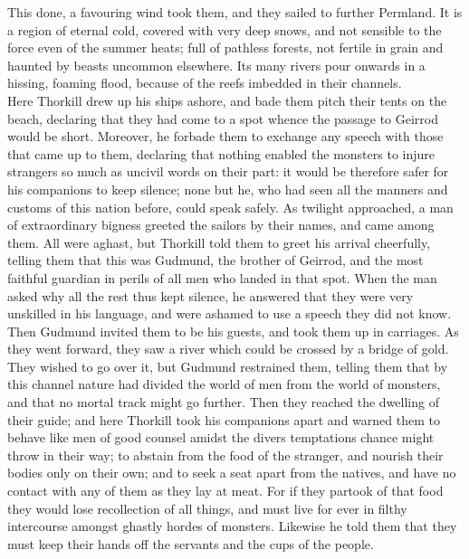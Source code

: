\documentclass[10pt,a4paper]{report}
\begin{document}
This done, a favouring wind took them, and they sailed to further Permland. It is a region of eternal cold, covered with very deep snows, and not sensible to the force even of the summer heats; full of pathless forests, not fertile in grain and haunted by beasts uncommon elsewhere. Its many rivers pour onwards in a hissing, foaming flood, because of the reefs imbedded in their channels.\\

Here Thorkill drew up his ships ashore, and bade them pitch their tents on the beach, declaring that they had come to a spot whence the passage to Geirrod would be short. Moreover, he forbade them to exchange any speech with those that came up to them, declaring that nothing enabled the monsters to injure strangers so much as uncivil words on their part: it would be therefore safer for his companions to keep silence; none but he, who had seen all the manners and customs of this nation before, could speak safely. As twilight approached, a man of extraordinary bigness greeted the sailors by their names, and came among them. All were aghast, but Thorkill told them to greet his arrival cheerfully, telling them that this was Gudmund, the brother of Geirrod, and the most faithful guardian in perils of all men who landed in that spot. When the man asked why all the rest thus kept silence, he answered that they were very unskilled in his language, and were ashamed to use a speech they did not know. Then Gudmund invited them to be his guests, and took them up in carriages. As they went forward, they saw a river which could be crossed by a bridge of gold. They wished to go over it, but Gudmund restrained them, telling them that by this channel nature had divided the world of men from the world of monsters, and that no mortal track might go further. Then they reached the dwelling of their guide; and here Thorkill took his companions apart and warned them to behave like men of good counsel amidst the divers temptations chance might throw in their way; to abstain from the food of the stranger, and nourish their bodies only on their own; and to seek a seat apart from the natives, and have no contact with any of them as they lay at meat. For if they partook of that food they would lose recollection of all things, and must live for ever in filthy intercourse amongst ghastly hordes of monsters. Likewise he told them that they must keep their hands off the servants and the cups of the people.\\
\end{document}
